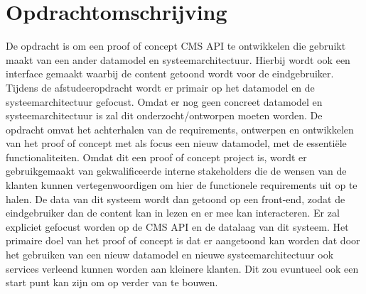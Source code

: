 \section{Opdrachtomschrijving}
De opdracht is om een proof of concept CMS API te ontwikkelen die gebruikt maakt van een ander datamodel en systeemarchitectuur.
Hierbij wordt ook een interface gemaakt waarbij de content getoond wordt voor de eindgebruiker.
Tijdens de afstudeeropdracht wordt er primair op het datamodel en de systeemarchitectuur gefocust.
Omdat er nog geen concreet datamodel en systeemarchitectuur is zal dit onderzocht/ontworpen moeten worden.
\whitespace
De opdracht omvat het achterhalen van de requirements, ontwerpen en ontwikkelen van het proof of
concept met als focus een nieuw datamodel, met de essentiële functionaliteiten. Omdat dit een proof of
concept project is, wordt er gebruikgemaakt van gekwalificeerde interne stakeholders die de wensen van
de klanten kunnen vertegenwoordigen om hier de functionele requirements uit op te halen.
\whitespace
De data van dit systeem wordt dan getoond op een front-end, zodat de eindgebruiker dan de content kan in
lezen en er mee kan interacteren. Er zal expliciet gefocust worden op de CMS API en de datalaag van dit
systeem.
\whitespace
{}
\whitespace
{}
Het primaire doel van het proof of concept is dat er aangetoond kan worden dat door het gebruiken van een nieuw
datamodel en nieuwe systeemarchitectuur ook services verleend kunnen worden aan kleinere klanten.
Dit zou evuntueel ook een start punt kan zijn om op verder van te bouwen.

